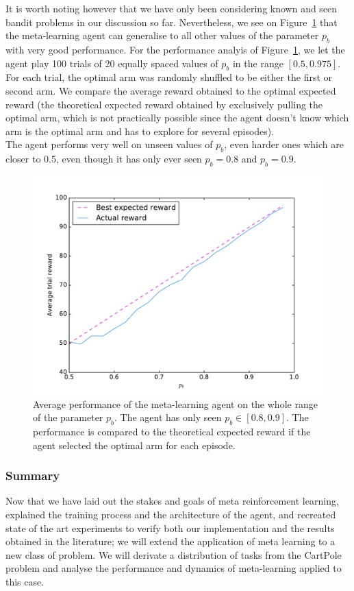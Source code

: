 It is worth noting however that we have only been considering known and seen
bandit problems in our discussion so far. Nevertheless, we see 
on Figure~\ref{fig:bandit_test} that the meta-learning agent can generalise to
all other values of the parameter $p_b$ with very good performance. For the 
performance analyis of Figure~\ref{fig:bandit_test}, we let the agent play 
100 trials of 20 equally spaced values of $p_b$ in the range $[0.5, 0.975]$.
For each trial, the optimal arm was randomly shuffled to be either the first
or second arm. We compare the average reward obtained to the optimal expected
reward (the theoretical expected reward obtained by exclusively pulling the
optimal arm, which is not practically possible since the agent doesn't know
which arm is the optimal arm and has to explore for several episodes).\\

The agent performs very well on unseen values of $p_b$, even harder ones which
are closer to 0.5, even though it has only ever seen $p_b = 0.8$ and $p_b = 0.9$.

\begin{figure}
	\centering
	\includegraphics[width=0.8\linewidth]{fig/bandit_test.pdf}
	\caption{Average performance of the meta-learning agent on the whole
	range of the parameter $p_b$. The agent has only seen
	$p_b \in [0.8, 0.9]$. The performance is compared to the theoretical
	expected reward if the agent selected the optimal arm for each episode.}
	\label{fig:bandit_test}
\end{figure}


\subsubsection{Summary}
Now that we have laid out the stakes and goals of meta reinforcement learning,
explained the training process and the architecture of the agent,
and recreated state of the art experiments to verify both our implementation
and the results obtained in the literature; we will extend the application
of meta learning to a new class of problem. We will derivate a distribution
of tasks from the CartPole problem and analyse the performance and dynamics
of meta-learning applied to this case.


